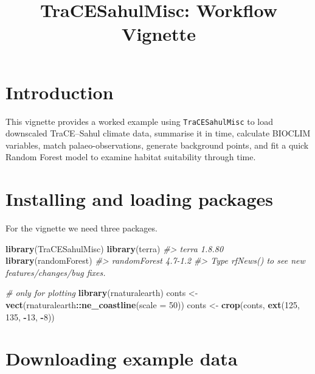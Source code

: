 \documentclass[
]{article}
\title{TraCESahulMisc: Workflow Vignette}
\author{}
\date{\vspace{-2.5em}}
\newenvironment{Shaded}{\begin{snugshade}}{\end{snugshade}}
\newcommand{\AttributeTok}[1]{\textcolor[rgb]{0.13,0.29,0.53}{#1}}
\newcommand{\CommentTok}[1]{\textcolor[rgb]{0.56,0.35,0.01}{\textit{#1}}}
\newcommand{\DecValTok}[1]{\textcolor[rgb]{0.00,0.00,0.81}{#1}}
\newcommand{\FunctionTok}[1]{\textcolor[rgb]{0.13,0.29,0.53}{\textbf{#1}}}
\newcommand{\NormalTok}[1]{#1}
\newcommand{\OtherTok}[1]{\textcolor[rgb]{0.56,0.35,0.01}{#1}}
\newcommand{\SpecialCharTok}[1]{\textcolor[rgb]{0.81,0.36,0.00}{\textbf{#1}}}
\begin{document}
\maketitle

\section{Introduction}\label{introduction}

This vignette provides a worked example using \texttt{TraCESahulMisc} to
load downscaled TraCE--Sahul climate data, summarise it in time,
calculate BIOCLIM variables, match palaeo-observations, generate
background points, and fit a quick Random Forest model to examine
habitat suitability through time.

\section{Installing and loading
packages}\label{installing-and-loading-packages}

For the vignette we need three packages.

\begin{Shaded}
\begin{Highlighting}[]
\FunctionTok{library}\NormalTok{(TraCESahulMisc)}
\FunctionTok{library}\NormalTok{(terra)}
\CommentTok{\#\textgreater{} terra 1.8.80}
\FunctionTok{library}\NormalTok{(randomForest)}
\CommentTok{\#\textgreater{} randomForest 4.7{-}1.2}
\CommentTok{\#\textgreater{} Type rfNews() to see new features/changes/bug fixes.}

\CommentTok{\# only for plotting}
\FunctionTok{library}\NormalTok{(rnaturalearth)}
\NormalTok{conts }\OtherTok{\textless{}{-}} \FunctionTok{vect}\NormalTok{(rnaturalearth}\SpecialCharTok{::}\FunctionTok{ne\_coastline}\NormalTok{(}\AttributeTok{scale =} \DecValTok{50}\NormalTok{))}
\NormalTok{conts }\OtherTok{\textless{}{-}} \FunctionTok{crop}\NormalTok{(conts, }\FunctionTok{ext}\NormalTok{(}\DecValTok{125}\NormalTok{, }\DecValTok{135}\NormalTok{, }\SpecialCharTok{{-}}\DecValTok{13}\NormalTok{, }\SpecialCharTok{{-}}\DecValTok{8}\NormalTok{))}
\end{Highlighting}
\end{Shaded}

\section{Downloading example data}\label{downloading-example-data}
\end{document}
